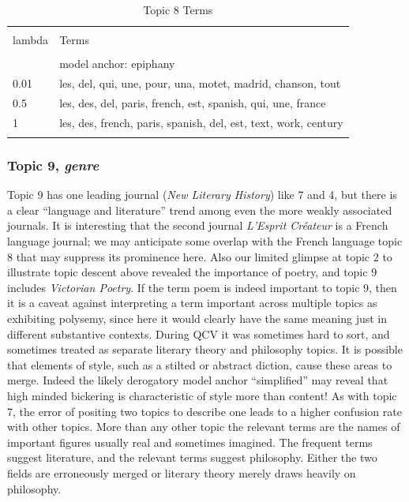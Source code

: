 \documentclass[]{book}
\theoremstyle{definition}
\theoremstyle{definition}
\theoremstyle{definition}
\theoremstyle{remark}
\begin{document}
\begin{table}[!htbp] \centering 
  \caption{Topic 8 Terms} 
  \label{tab:t8d} 
\begin{tabularx}{\textwidth}{@{\extracolsep{5pt}} lY} 
\\[-1.8ex]\hline 
\hline \\[-1.8ex] 
lambda & Terms \\ 
\hline \\[-1.8ex] 
 & model anchor: epiphany \\ 
0.01 & les, del, qui, une, pour, una, motet, madrid, chanson, tout \\ 
0.5 & les, des, del, paris, french, est, spanish, qui, une, france \\ 
1 & les, des, french, paris, spanish, del, est, text, work, century \\ 
\hline \\[-1.8ex] 
\end{tabularx} 
\end{table}

\hypertarget{topic-9-genre}{%
\subsubsection{\texorpdfstring{Topic 9,
\emph{genre}}{Topic 9, genre}}\label{topic-9-genre}}

Topic 9 has one leading journal (\emph{New Literary History}) like 7 and
4, but there is a clear ``language and literature'' trend among even the
more weakly associated journals. It is interesting that the second
journal \emph{L'Esprit Créateur} is a French language journal; we may
anticipate some overlap with the French language topic 8 that may
suppress its prominence here. Also our limited glimpse at topic 2 to
illustrate topic descent above revealed the importance of poetry, and
topic 9 includes \emph{Victorian Poetry}. If the term poem is indeed
important to topic 9, then it is a caveat against interpreting a term
important across multiple topics as exhibiting polysemy, since here it
would clearly have the same meaning just in different substantive
contexts. During QCV it was sometimes hard to sort, and sometimes
treated as separate literary theory and philosophy topics. It is
possible that elements of style, such as a stilted or abstract diction,
cause these areas to merge. Indeed the likely derogatory model anchor
``simplified'' may reveal that high minded bickering is characteristic
of style more than content! As with topic 7, the error of positing two
topics to describe one leads to a higher confusion rate with other
topics. More than any other topic the relevant terms are the names of
important figures usually real and sometimes imagined. The frequent
terms suggest literature, and the relevant terms suggest philosophy.
Either the two fields are erroneously merged or literary theory merely
draws heavily on philosophy.
\end{document}

